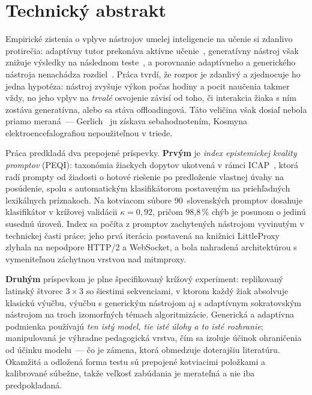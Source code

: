 \chapter{Technický abstrakt}
\label{chapter:Technical-abstract}

Empirické zistenia o vplyve nástrojov umelej inteligencie na učenie si zdanlivo protirečia: adaptívny tutor prekonáva aktívne učenie~\cite{kestin2025aitutoring}, generatívny nástroj však znižuje výsledky na následnom teste~\cite{bastani2025harm}, a porovnanie adaptívneho a generického nástroja nenachádza rozdiel~\cite{slijepcevic2025khanmigo}. Práca tvrdí, že rozpor je zdanlivý a zjednocuje ho jedna hypotéza: nástroj zvyšuje výkon počas hodiny a pocit naučenia takmer vždy, no jeho vplyv na \emph{trvalé} osvojenie závisí od toho, či interakcia žiaka s ním zostáva generatívna, alebo sa stáva offloadingová. Táto veličina však dosiaľ nebola priamo meraná~--- Gerlich~\cite{gerlich2025offloading} ju získava sebahodnotením, Kosmyna~\cite{kosmyna2025brain} elektroencefalografiou nepoužiteľnou v triede.

Práca predkladá dva prepojené príspevky. \textbf{Prvým} je \emph{index epistemickej kvality promptov} (PEQI): taxonómia žiackych dopytov ukotvená v rámci ICAP~\cite{chi2014icap}, ktorá radí prompty od žiadosti o hotové riešenie po predloženie vlastnej úvahy na posúdenie, spolu s automatickým klasifikátorom postaveným na priehľadných lexikálnych príznakoch. Na kotviacom súbore 90~slovenských promptov dosahuje klasifikátor v krížovej validácii $\kappa=0{,}92$, pričom 98,8\,\% chýb je posunom o jedinú susednú úroveň. Index sa počíta z promptov zachytených nástrojom vyvinutým v technickej časti práce; jeho prvá iterácia postavená na knižnici LittleProxy zlyhala na nepodpore HTTP/2 a WebSocket, a bola nahradená architektúrou s vymeniteľnou záchytnou vrstvou nad mitmproxy.

\textbf{Druhým} príspevkom je plne špecifikovaný krížový experiment: replikovaný latinský štvorec $3\times3$ so šiestimi sekvenciami, v ktorom každý žiak absolvuje klasickú výučbu, výučbu s generickým nástrojom aj s adaptívnym sokratovským nástrojom na troch izomorfných témach algoritmizácie. Generická a adaptívna podmienka používajú \emph{ten istý model, tie isté úlohy a to isté rozhranie}; manipulovaná je výhradne pedagogická vrstva, čím sa izoluje účinok ohraničenia od účinku modelu~--- čo je zámena, ktorá obmedzuje doterajšiu literatúru. Okamžitá a odložená forma testu sú prepojené kotviacimi položkami a kalibrované súbežne, takže veľkosť zabúdania je merateľná a nie iba predpokladaná.

